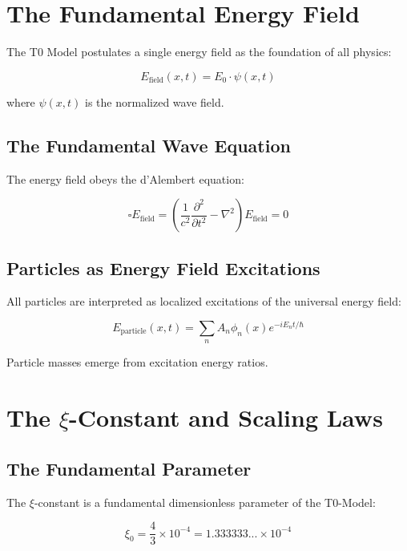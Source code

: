 \documentclass[12pt,a4paper]{report}
\begin{document}
	\section{The Fundamental Energy Field}
	
	The T0 Model postulates a single energy field as the foundation of all physics:
	
	\begin{equation}
		E_{\text{field}}(x,t) = E_0 \cdot \psi(x,t)
	\end{equation}
	
	where $\psi(x,t)$ is the normalized wave field.
	
	\subsection{The Fundamental Wave Equation}
	
	The energy field obeys the d'Alembert equation:
	
	\begin{equation}
		\square E_{\text{field}} = \left(\frac{1}{c^2}\frac{\partial^2}{\partial t^2} - \nabla^2\right) E_{\text{field}} = 0
	\end{equation}
	
	\subsection{Particles as Energy Field Excitations}
	
	All particles are interpreted as localized excitations of the universal energy field:
	
	\begin{equation}
		E_{\text{particle}}(x,t) = \sum_n A_n \phi_n(x) e^{-iE_n t/\hbar}
	\end{equation}
	
	Particle masses emerge from excitation energy ratios.
	
\section{The $\xi$-Constant and Scaling Laws}

\subsection{The Fundamental Parameter}

The $\xi$-constant is a fundamental dimensionless parameter of the T0-Model:

\begin{equation}
	\boxed{\xi_0 = \frac{4}{3} \times 10^{-4} = 1.333333... \times 10^{-4}}
\end{equation}
\end{document}
